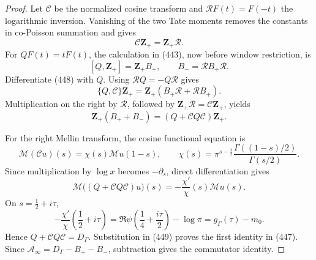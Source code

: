 \documentclass[11pt]{article}
\begin{document}
\begin{proof}
Let \(\mathcal C\) be the normalized cosine transform and
\(\mathcal R F(t)=F(-t)\) the logarithmic inversion.  Vanishing of the two
Tate moments removes the constants in co-Poisson summation and gives
\begin{equation}
 \mathcal C\mathbf Z_+=\mathbf Z_+\mathcal R.         \tag{448}
\end{equation}
For \(QF(t)=tF(t)\), the calculation in (443), now before window
restriction, is
\[
 [Q,\mathbf Z_+]=\mathbf Z_+B_+,\qquad
 B_-=\mathcal RB_+\mathcal R.
\]
Differentiate (448) with \(Q\).  Using
\(\mathcal RQ=-Q\mathcal R\) gives
\[
 \{Q,\mathcal C\}\mathbf Z_+
 =\mathbf Z_+(B_+\mathcal R+\mathcal RB_+).
\]
Multiplication on the right by \(\mathcal R\), followed by
\(\mathbf Z_+\mathcal R=\mathcal C\mathbf Z_+\), yields
\begin{equation}
 \mathbf Z_+(B_++B_-)
 =(Q+\mathcal C Q\mathcal C)\mathbf Z_+.             \tag{449}
\end{equation}

For the right Mellin transform, the cosine functional equation is
\[
 \mathcal M(\mathcal Cu)(s)
 =\chi(s)\mathcal Mu(1-s),\qquad
 \chi(s)=\pi^{s-\frac12}
 \frac{\Gamma((1-s)/2)}{\Gamma(s/2)}.
\]
Since multiplication by \(\log x\) becomes
\(-\partial_s\), direct differentiation gives
\[
 \mathcal M\bigl((Q+\mathcal C Q\mathcal C)u\bigr)(s)
 =-\frac{\chi'}{\chi}(s)\mathcal Mu(s).
\]
On \(s=\frac12+i\tau\),
\begin{equation}
 -\frac{\chi'}{\chi}\left(\frac12+i\tau\right)
 =\Re\psi\left(\frac14+\frac{i\tau}{2}\right)-\log\pi
 =g_\Gamma(\tau)-m_0.                               \tag{450}
\end{equation}
Hence \(Q+\mathcal C Q\mathcal C=D_\Gamma\).  Substitution in (449)
proves the first identity in (447).  Since
\(\mathcal A_\infty=D_\Gamma-B_+-B_-\), subtraction gives the commutator
identity.
\end{proof}
\end{document}
